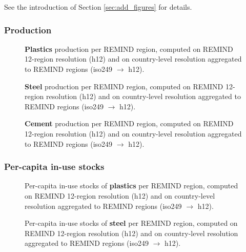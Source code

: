 See the introduction of Section \ref{sec:add_figures} for details.

\subsubsection{Production}

\begin{figure}[htbp]
    \centering
    \caption{\textbf{Plastics} production per REMIND region, computed on REMIND 12-region resolution (h12) and on country-level resolution aggregated to REMIND regions (iso249 $\rightarrow$ h12).}
    \label{fig:production_plastics_h12_vs_iso249}
\end{figure}

\begin{figure}[htbp]
    \centering
    \caption{\textbf{Steel} production per REMIND region, computed on REMIND 12-region resolution (h12) and on country-level resolution aggregated to REMIND regions (iso249 $\rightarrow$ h12).}
    \label{fig:production_steel_h12_vs_iso249}
\end{figure}

\begin{figure}[htbp]
    \centering
    \caption{\textbf{Cement} production per REMIND region, computed on REMIND 12-region resolution (h12) and on country-level resolution aggregated to REMIND regions (iso249 $\rightarrow$ h12).}
    \label{fig:production_cement_h12_vs_iso249}
\end{figure}

\clearpage
\subsubsection{Per-capita in-use stocks}

\begin{figure}[htbp]
    \centering
    \caption{Per-capita in-use stocks of \textbf{plastics} per REMIND region, computed on REMIND 12-region resolution (h12) and on country-level resolution aggregated to REMIND regions (iso249 $\rightarrow$ h12).}
    \label{fig:pcstocks_plastics_h12_vs_iso249}
\end{figure}

\begin{figure}[htbp]
    \centering
    \caption{Per-capita in-use stocks of \textbf{steel} per REMIND region, computed on REMIND 12-region resolution (h12) and on country-level resolution aggregated to REMIND regions (iso249 $\rightarrow$ h12).}
    \label{fig:pcstocks_steel_h12_vs_iso249}
\end{figure}

